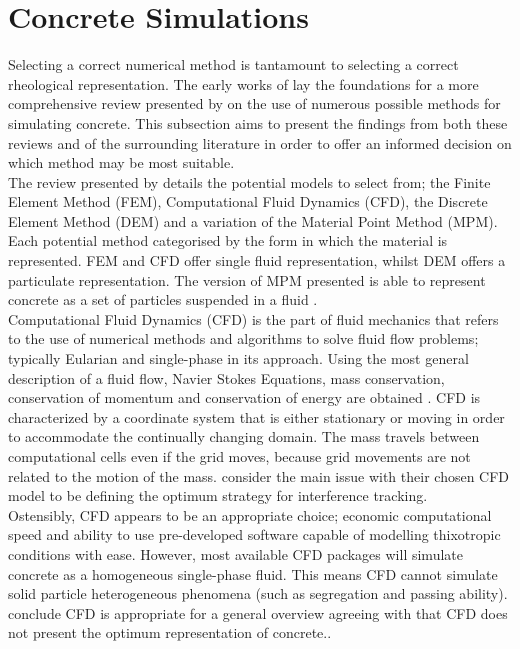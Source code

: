 
\section{Concrete Simulations}
\noindent
Selecting a correct numerical method is tantamount to selecting a correct rheological representation. The early works of \citet{roussel07} lay the foundations for a more comprehensive review presented by \citet{sofcf} on the use of numerous possible methods for simulating concrete. This subsection aims to present the findings from both these reviews and of the surrounding literature in order to offer an informed decision on which method may be most suitable.\\
\newline
\noindent
The review presented by \citet{roussel07} details the potential models to select from; the Finite Element Method (FEM), Computational Fluid Dynamics (CFD), the Discrete Element Method (DEM) and a variation of the Material Point Method (MPM). Each potential method categorised by the form in which the material is represented.  FEM and CFD offer single fluid representation, whilst DEM offers a particulate representation. The version of MPM presented is able to represent concrete as a set of particles suspended in a fluid \citep{dufour05}.\\
\newline
\noindent
Computational Fluid Dynamics (CFD) is the part of fluid mechanics that refers to the use of numerical methods and algorithms to solve fluid flow problems; typically Eularian and single-phase in its approach. Using the most general description of a fluid flow, Navier Stokes Equations, mass conservation, conservation of momentum and conservation of energy are obtained \cite{tich15}. CFD is characterized by a coordinate system that is either stationary or moving in order to accommodate the continually changing domain. The mass travels between computational cells even if the grid moves, because grid movements are not related to the motion of the mass.\cite{GRAM14} consider the main issue with their chosen CFD model to be defining the optimum strategy for interference tracking.\\
\newline
\noindent
Ostensibly, CFD appears to be an appropriate choice; economic computational speed and ability to use pre-developed software capable of modelling thixotropic conditions with ease. However, most available CFD packages will simulate concrete as a homogeneous single-phase fluid. This means CFD cannot simulate solid particle heterogeneous phenomena (such as segregation and passing ability). \citep{sofcf} conclude CFD is appropriate for a general overview agreeing with \citet{gram2011} that CFD does not present the optimum representation of concrete..\\
